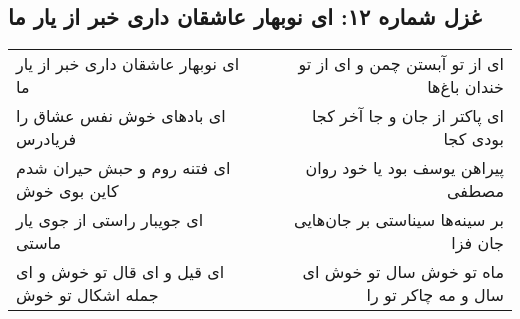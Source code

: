\begin{center}
\section*{غزل شماره ۱۲: ای نوبهار عاشقان داری خبر از یار ما}
\label{sec:0012}
\begin{longtable}{l p{0.5cm} r}
ای نوبهار عاشقان داری خبر از یار ما
&&
ای از تو آبستن چمن و ای از تو خندان باغ‌ها
\\
ای بادهای خوش نفس عشاق را فریادرس
&&
ای پاکتر از جان و جا آخر کجا بودی کجا
\\
ای فتنه روم و حبش حیران شدم کاین بوی خوش
&&
پیراهن یوسف بود یا خود روان مصطفی
\\
ای جویبار راستی از جوی یار ماستی
&&
بر سینه‌ها سیناستی بر جان‌هایی جان فزا
\\
ای قیل و ای قال تو خوش و ای جمله اشکال تو خوش
&&
ماه تو خوش سال تو خوش ای سال و مه چاکر تو را
\\
\end{longtable}
\end{center}
